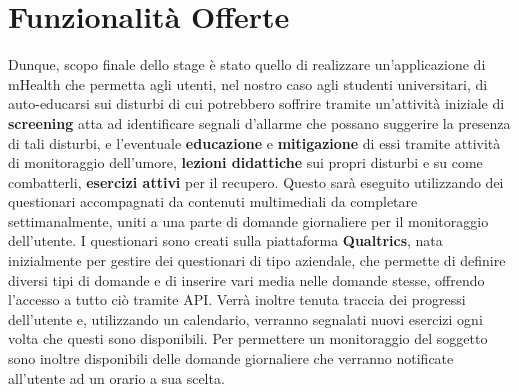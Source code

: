 \section{Funzionalità Offerte}
Dunque, scopo finale dello stage è stato quello di realizzare un'applicazione di mHealth che permetta agli utenti, nel nostro caso agli studenti universitari, di auto-educarsi sui disturbi di cui potrebbero soffrire tramite un'attività iniziale di \textbf{screening} atta ad identificare segnali d'allarme che possano suggerire la presenza di tali disturbi, e l'eventuale \textbf{educazione} e \textbf{mitigazione} di essi tramite attività di monitoraggio dell'umore, \textbf{lezioni didattiche} sui propri disturbi e su come combatterli, \textbf{esercizi attivi} per il recupero.
Questo sarà eseguito utilizzando dei questionari accompagnati da contenuti multimediali da
completare settimanalmente, uniti a una parte di domande giornaliere per il monitoraggio
dell'utente. I questionari sono creati sulla piattaforma \textbf{Qualtrics}, nata inizialmente per gestire dei questionari di tipo aziendale, che permette di definire diversi tipi di domande e di inserire vari media nelle domande stesse, offrendo l'accesso a tutto ciò tramite API.
Verrà inoltre tenuta traccia dei progressi dell'utente e, utilizzando un calendario, verranno segnalati nuovi esercizi ogni volta che questi sono disponibili. Per permettere un monitoraggio del soggetto sono inoltre disponibili delle domande giornaliere che verranno notificate all'utente ad un orario a sua scelta.

